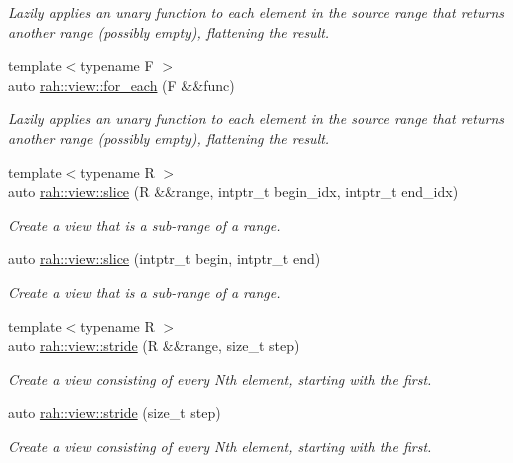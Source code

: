 \begin{DoxyCompactItemize}
\begin{DoxyCompactList}\small\item\em Lazily applies an unary function to each element in the source range that returns another range (possibly empty), flattening the result. \end{DoxyCompactList}\item 
{\footnotesize template$<$typename F $>$ }\\auto \mbox{\hyperlink{namespacerah_1_1view_a86a39630c0b54bab115c18fe1d42847c}{rah\+::view\+::for\+\_\+each}} (F \&\&func)
\begin{DoxyCompactList}\small\item\em Lazily applies an unary function to each element in the source range that returns another range (possibly empty), flattening the result. \end{DoxyCompactList}\item 
{\footnotesize template$<$typename R $>$ }\\auto \mbox{\hyperlink{namespacerah_1_1view_a419374b95b3b9601655b0edf753963c3}{rah\+::view\+::slice}} (R \&\&range, intptr\+\_\+t begin\+\_\+idx, intptr\+\_\+t end\+\_\+idx)
\begin{DoxyCompactList}\small\item\em Create a view that is a sub-\/range of a range. \end{DoxyCompactList}\item 
auto \mbox{\hyperlink{namespacerah_1_1view_af2baef5b0078f0768cbfee4aae4e9924}{rah\+::view\+::slice}} (intptr\+\_\+t begin, intptr\+\_\+t end)
\begin{DoxyCompactList}\small\item\em Create a view that is a sub-\/range of a range. \end{DoxyCompactList}\item 
{\footnotesize template$<$typename R $>$ }\\auto \mbox{\hyperlink{namespacerah_1_1view_a112a1a8d31435c1070c4cd98cc02d96a}{rah\+::view\+::stride}} (R \&\&range, size\+\_\+t step)
\begin{DoxyCompactList}\small\item\em Create a view consisting of every Nth element, starting with the first. \end{DoxyCompactList}\item 
auto \mbox{\hyperlink{namespacerah_1_1view_a6b2ab3621be4004c35d77f06165fce78}{rah\+::view\+::stride}} (size\+\_\+t step)
\begin{DoxyCompactList}\small\item\em Create a view consisting of every Nth element, starting with the first. \end{DoxyCompactList}\item 

\end{DoxyCompactItemize}
